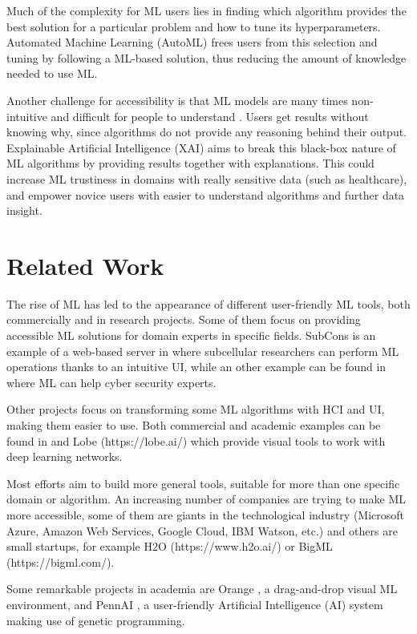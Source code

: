 \documentclass[runningheads]{llncs}
\begin{document}
Much of the complexity for ML users lies in finding which algorithm provides the best solution for a particular problem and how to tune its hyperparameters. Automated Machine Learning (AutoML) frees users from this selection and tuning \cite{automl} by following a ML-based solution, thus reducing the amount of knowledge needed to use ML.

Another challenge for accessibility is that ML models are many times non-intuitive and difficult for people to understand \cite{xai}. Users get results without knowing why, since algorithms do not provide any reasoning behind their output. Explainable Artificial Intelligence (XAI) aims to break this black-box nature of ML algorithms by providing results together with explanations. This could increase ML trustiness in domains with really sensitive data (such as healthcare), and empower novice users with easier to understand algorithms and further data insight.

\section{Related Work}

The rise of ML has led to the appearance of different user-friendly ML tools, both commercially and in research projects. Some of them focus on providing accessible ML solutions for domain experts in specific fields. SubCons \cite{subcons} is an example of a web-based server in where subcellular researchers can perform ML operations thanks to an intuitive UI, while an other example can be found in \cite{cyber} where ML can help cyber security experts.

Other projects focus on transforming some ML algorithms with HCI and UI, making them easier to use. Both commercial and academic examples can be found in \cite{Barista} and Lobe (https://lobe.ai/) which provide visual tools to work with deep learning networks.

Most efforts aim to build more general tools, suitable for more than one specific domain or algorithm. An increasing number of companies are trying to make ML more accessible, some of them are giants in the technological industry (Microsoft Azure, Amazon Web Services, Google Cloud, IBM Watson, etc.) and others are small startups, for example H2O (https://www.h2o.ai/) or BigML (https://bigml.com/).

Some remarkable projects in academia are Orange \cite{orange}, a drag-and-drop visual ML environment, and PennAI \cite{pennAI}, a user-friendly Artificial Intelligence (AI) system making use of genetic programming.
\end{document}
